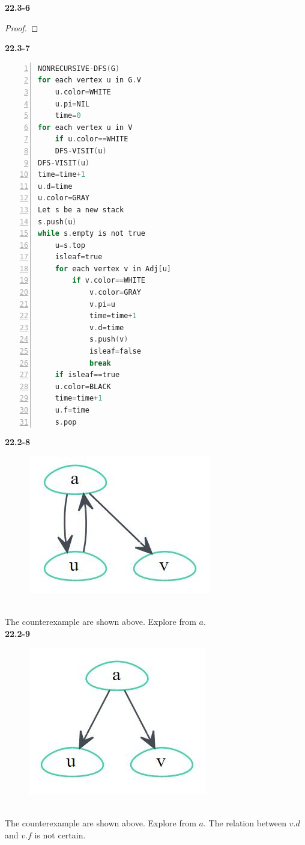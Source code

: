 \documentclass{article}
\begin{document}
\textbf{22.3-6}
\begin{proof}
\end{proof}
\textbf{22.3-7}
\begin{lstlisting}[language=C,numbers=left]
NONRECURSIVE-DFS(G)
for each vertex u in G.V
	u.color=WHITE
	u.pi=NIL
	time=0
for each vertex u in V
	if u.color==WHITE
	DFS-VISIT(u)
DFS-VISIT(u)
time=time+1
u.d=time
u.color=GRAY
Let s be a new stack
s.push(u)
while s.empty is not true
	u=s.top
	isleaf=true
	for each vertex v in Adj[u]
		if v.color==WHITE
			v.color=GRAY
			v.pi=u
			time=time+1
			v.d=time
			s.push(v)
			isleaf=false
			break
	if isleaf==true
	u.color=BLACK
	time=time+1
	u.f=time
	s.pop
\end{lstlisting}
\textbf{22.2-8}
\begin{figure}[htbp]
\includegraphics[scale=0.5]{16_1.jpg}
\end{figure}
\\The counterexample are shown above. Explore from $a$.\\
\textbf{22.2-9}
\begin{figure}[htbp]
	\includegraphics[scale=0.5]{16_2.jpg}
\end{figure}
\\The counterexample are shown above. Explore from $a$. The relation between $v.d$ and $v.f$ is not certain.\\
\end{document}

